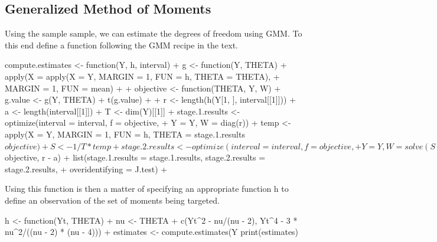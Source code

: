 \documentclass[a4paper]{article}
\begin{document}
\subsection{Generalized Method of Moments}
Using the sample sample, we can estimate the degrees of freedom using GMM.  To this end define a
function following the GMM recipe in the text.  
\begin{Schunk}
\begin{Sinput}
 compute.estimates <- function(Y, h, interval) {
+     g <- function(Y, THETA) {
+         apply(X = apply(X = Y, MARGIN = 1, FUN = h, THETA = THETA), 
+             MARGIN = 1, FUN = mean)
+     }
+     objective <- function(THETA, Y, W) {
+         g.value <- g(Y, THETA)
+         t(g.value) %
+     }
+     r <- length(h(Y[1, ], interval[[1]]))
+     a <- length(interval[[1]])
+     T <- dim(Y)[[1]]
+     stage.1.results <- optimize(interval = interval, f = objective, 
+         Y = Y, W = diag(r))
+     temp <- apply(X = Y, MARGIN = 1, FUN = h, THETA = stage.1.results$objective)
+     S <- 1/T * temp %
+     stage.2.results <- optimize(interval = interval, f = objective, 
+         Y = Y, W = solve(S))
+     J.test <- 1 - pchisq(T * stage.2.results$objective, r - a)
+     list(stage.1.results = stage.1.results, stage.2.results = stage.2.results, 
+         overidentifying = J.test)
+ }
\end{Sinput}
\end{Schunk}
Using this function is then a matter of specifying an appropriate function h to define an observation of
the set of moments being targeted.
\begin{Schunk}
\begin{Sinput}
 h <- function(Yt, THETA) {
+     nu <- THETA
+     c(Yt^2 - nu/(nu - 2), Yt^4 - 3 * nu^2/((nu - 2) * (nu - 4)))
+ }
 estimates <- compute.estimates(Y %
 print(estimates)
\end{Sinput}
\end{Schunk}
\end{document}
